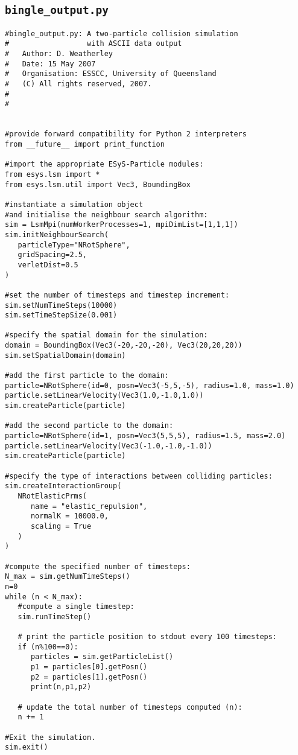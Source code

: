 \subsection{\texttt{bingle\_output.py}}\label{code:bingle_output}

\begin{verbatim}
#bingle_output.py: A two-particle collision simulation 
#                  with ASCII data output
#	Author: D. Weatherley
#	Date: 15 May 2007
#	Organisation: ESSCC, University of Queensland
#	(C) All rights reserved, 2007.
#
#


#provide forward compatibility for Python 2 interpreters
from __future__ import print_function

#import the appropriate ESyS-Particle modules:
from esys.lsm import *
from esys.lsm.util import Vec3, BoundingBox

#instantiate a simulation object 
#and initialise the neighbour search algorithm:
sim = LsmMpi(numWorkerProcesses=1, mpiDimList=[1,1,1])
sim.initNeighbourSearch(
   particleType="NRotSphere",
   gridSpacing=2.5,
   verletDist=0.5
)

#set the number of timesteps and timestep increment:
sim.setNumTimeSteps(10000)
sim.setTimeStepSize(0.001)

#specify the spatial domain for the simulation:
domain = BoundingBox(Vec3(-20,-20,-20), Vec3(20,20,20))
sim.setSpatialDomain(domain)

#add the first particle to the domain:
particle=NRotSphere(id=0, posn=Vec3(-5,5,-5), radius=1.0, mass=1.0)
particle.setLinearVelocity(Vec3(1.0,-1.0,1.0))
sim.createParticle(particle)

#add the second particle to the domain:
particle=NRotSphere(id=1, posn=Vec3(5,5,5), radius=1.5, mass=2.0)
particle.setLinearVelocity(Vec3(-1.0,-1.0,-1.0))
sim.createParticle(particle)

#specify the type of interactions between colliding particles:
sim.createInteractionGroup(
   NRotElasticPrms(
      name = "elastic_repulsion",
      normalK = 10000.0,
      scaling = True
   )
)

#compute the specified number of timesteps:
N_max = sim.getNumTimeSteps()
n=0
while (n < N_max):
   #compute a single timestep:
   sim.runTimeStep()

   # print the particle position to stdout every 100 timesteps:
   if (n%100==0):
      particles = sim.getParticleList()
      p1 = particles[0].getPosn()
      p2 = particles[1].getPosn()
      print(n,p1,p2)

   # update the total number of timesteps computed (n):
   n += 1

#Exit the simulation.
sim.exit()
\end{verbatim}
